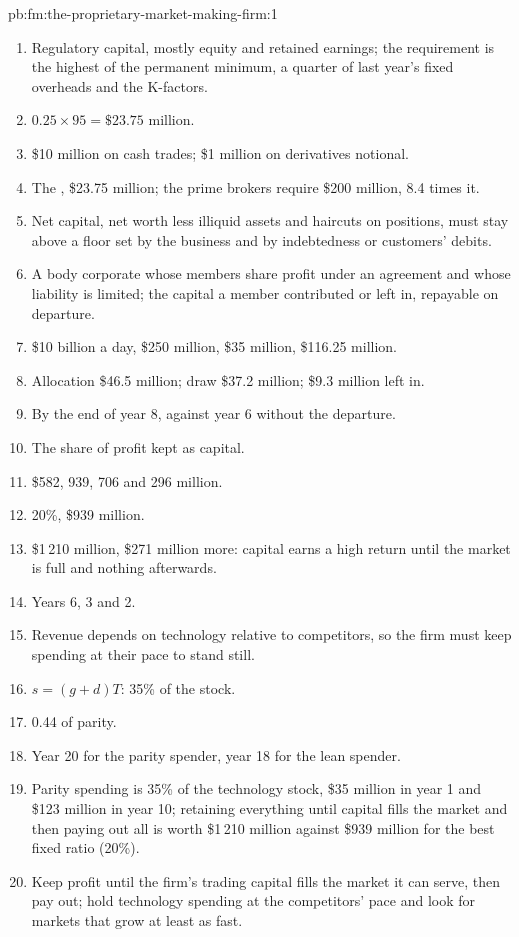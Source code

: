 \begin{solution}{pb:fm:the-proprietary-market-making-firm:1}
\begin{enumerate}
\item Regulatory capital, mostly equity and retained earnings; the requirement is the highest of the permanent minimum, a quarter of last year's
fixed overheads and the K-factors.
\item $0.25\times95=\$23.75$ million.
\item \$10 million on cash trades; \$1 million on derivatives notional.
\item The , \$23.75 million; the prime brokers require \$200 million, 8.4 times it.
\item Net capital, net worth less illiquid assets and haircuts on positions, must stay above a floor set by the business and by indebtedness or
customers' debits.
\item A body corporate whose members share profit under an agreement and whose liability is limited; the capital a member contributed or left in,
repayable on departure.
\item \$10 billion a day, \$250 million, \$35 million, \$116.25 million.
\item Allocation \$46.5 million; draw \$37.2 million; \$9.3 million left in.
\item By the end of year 8, against year 6 without the departure.
\item The share of profit kept as capital.
\item \$582, 939, 706 and 296 million.
\item 20\%, \$939 million.
\item \$1\,210 million, \$271 million more: capital earns a high return until the market is full and nothing afterwards.
\item Years 6, 3 and 2.
\item Revenue depends on technology relative to competitors, so the firm must keep spending at their pace to stand still.
\item $s=(g+d)T$: 35\% of the stock.
\item 0.44 of parity.
\item Year 20 for the parity spender, year 18 for the lean spender.
\item Parity spending is 35\% of the technology stock, \$35 million in year 1 and \$123 million in year 10; retaining everything until capital fills
the market and then paying out all is worth \$1\,210 million against \$939 million for the best fixed ratio (20\%).
\item Keep profit until the firm's trading capital fills the market it can serve, then pay out; hold technology spending at the competitors' pace
and look for markets that grow at least as fast.
\end{enumerate}
\end{solution}

